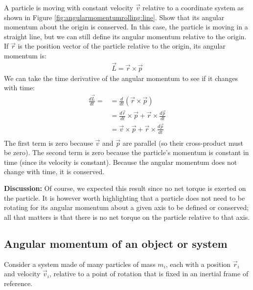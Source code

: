 \begin{example}{ A particle is moving with constant velocity $\vec v$ relative to a coordinate system as shown in Figure \ref{fig:angularmomentumrolling:line}. Show that its angular momentum about the origin is conserved. }
In this case, the particle is moving in a straight line, but we can still define its angular momentum relative to the origin. If $\vec r$ is the position vector of the particle relative to the origin, its angular momentum is:
\begin{align*}
\vec L = \vec r \times \vec p
\end{align*}
We can take the time derivative of the angular momentum to see if it changes with time:
\begin{align*}
\frac{d\vec L}{dt} = &= \frac{d}{dt} (\vec r\times \vec p)\\
&=\frac{d\vec r}{dt}\times \vec p + \vec r\times\frac{d\vec p}{dt}\\
&=\vec v\times \vec p + \vec r\times\frac{d\vec p}{dt}\\
\end{align*}
The first term is zero because $\vec v$ and $\vec p$ are parallel (so their cross-product must be zero). The second term is zero because the particle's momentum is constant in time (since its velocity is constant). Because the angular momentum does not change with time, it is conserved.  

\textbf{Discussion:} Of course, we expected this result since no net torque is exerted on the particle. It is however worth highlighting that a particle does not need to be rotating for its angular momentum about a given axis to be defined or conserved; all that matters is that there is no net torque on the particle relative to that axis.
\end{example} 
 
\subsection{Angular momentum of an object or system}
Consider a system made of many particles of mass $m_i$, each with a position $\vec r_i$ and velocity $\vec v_i$, relative to a point of rotation that is fixed in an inertial frame of reference. 

